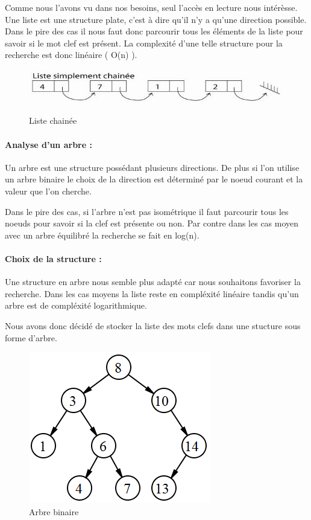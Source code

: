 \documentclass{article}
\begin{document}
Comme nous l'avons vu dans nos besoins, seul l'accès en lecture nous intérèsse. Une liste est une structure plate, c'est à dire qu'il n'y a qu'une direction possible.
Dans le pire des cas il nous faut donc parcourir tous les éléments de la liste pour savoir si le mot clef est présent.
La complexité d'une telle structure pour la recherche est donc linéaire ( O(n) ).

\begin{figure}[htp]
\centering
\includegraphics[scale=0.6]{images/liste.jpg}
\caption{Liste chainée}
\label{}
\end{figure}

\paragraph{Analyse d'un arbre :}
Un arbre est une structure possédant plusieurs directions. De plus si l'on utilise un arbre binaire
le choix de la direction est déterminé par le noeud courant et la valeur que l'on cherche. 

Dans le pire des cas, si l'arbre n'est pas isométrique il
faut parcourir tous les noeuds pour savoir si la clef est présente ou non. Par contre dans les cas moyen avec un arbre équilibré la recherche se fait en log(n).

\paragraph{Choix de la structure :}
Une structure en arbre nous semble plus adapté car nous souhaitons favoriser la recherche. Dans les cas moyens la liste reste en compléxité linéaire tandis qu'un arbre est de compléxité logarithmique.

Nous avons donc décidé de stocker la liste des mots clefs dans une stucture sous forme d'arbre.

 
\begin{figure}[htp]
\centering
\includegraphics[scale=0.5]{images/arbre.png}
\caption{Arbre binaire}
\label{}
\end{figure}
\end{document}
